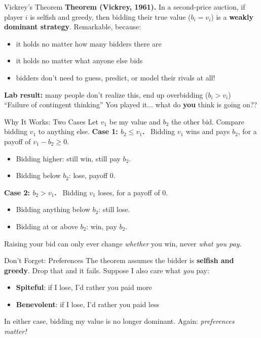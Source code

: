 \begin{frame}{Vickrey's Theorem}
\textbf{Theorem (Vickrey, 1961).} In a second-price auction, if player $i$ is selfish and
greedy, then bidding their true value ($b_i = v_i$) is a \textbf{weakly dominant strategy}.
\vfill
Remarkable, because:
\begin{itemize}
    \item it holds no matter how many bidders there are
    \item it holds no matter what anyone else bids
    \item bidders don't need to guess, predict, or model their rivals at all!
\end{itemize}
\vfill
\textbf{Lab result:} many people don't realize this, end up overbidding ($b_i > v_i$)\\
``Failure of contingent thinking''
\bsk
You played it... what do \textbf{you} think is going on??
\end{frame}

\begin{frame}{Why It Works: Two Cases}
Let $v_1$ be my value and $b_2$ the other bid. Compare bidding $v_1$ to anything else.
\bsk
\textbf{Case 1: $b_2\le v_1$.} \ Bidding $v_1$ wins and pays $b_2$, for a payoff of $v_1-b_2\ge 0$.
\begin{itemize}
    \item Bidding higher: still win, still pay $b_2$. \underline{\hspace{1.5in}}
    \item Bidding below $b_2$: lose, payoff 0. \underline{\hspace{1.5in}}
\end{itemize}
\bsk
\textbf{Case 2: $b_2>v_1$.} \ Bidding $v_1$ loses, for a payoff of 0.
\begin{itemize}
    \item Bidding anything below $b_2$: still lose. \underline{\hspace{1.5in}}
    \item Bidding at or above $b_2$: win, pay $b_2$. \underline{\hspace{1.5in}}
\end{itemize}
\bsk
Raising your bid can only ever change \textit{whether} you win, never \textit{what you pay}.
\end{frame}

\begin{frame}{Don't Forget: Preferences}
The theorem assumes the bidder is \textbf{selfish and greedy}.
\bsk
Drop that and it fails. Suppose I also care what \textit{you} pay:
\begin{itemize}
    \item \textbf{Spiteful}: if I lose, I'd rather you paid more \vspace{0.35in}
    \item \textbf{Benevolent}: if I lose, I'd rather you paid less \vspace{0.35in}
\end{itemize}
\bsk
In either case, bidding my value is no longer dominant.
\vfill
Again: \textit{preferences matter!}
\vspace{-0.3in}
\end{frame}

